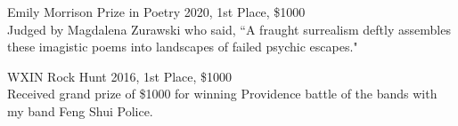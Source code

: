 Emily Morrison Prize in Poetry 2020, 1st Place,  \$1000  \\
Judged by Magdalena Zurawski who said, ``A fraught surrealism deftly assembles these imagistic poems into landscapes of failed psychic escapes."

WXIN Rock Hunt 2016, 1st Place, \$1000  \\
Received grand prize of \$1000 for winning Providence battle of the bands with my band Feng Shui Police.









 

